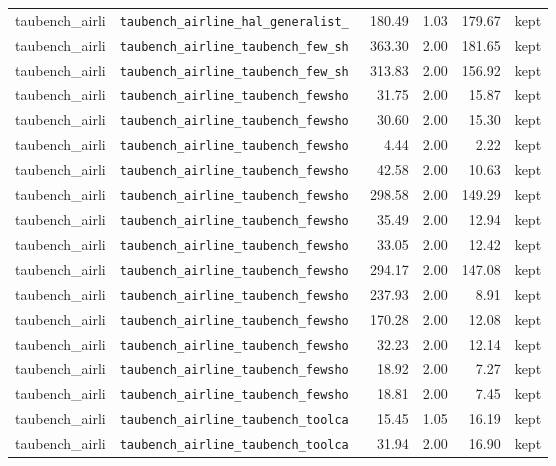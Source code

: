 {\begin{longtable}{llrrrl}
taubench\_airli & \texttt{\scriptsize taubench\_airline\_hal\_generalist\_~} & 180.49 & 1.03 & 179.67 & kept \\
taubench\_airli & \texttt{\scriptsize taubench\_airline\_taubench\_few\_sh~} & 363.30 & 2.00 & 181.65 & kept \\
taubench\_airli & \texttt{\scriptsize taubench\_airline\_taubench\_few\_sh~} & 313.83 & 2.00 & 156.92 & kept \\
taubench\_airli & \texttt{\scriptsize taubench\_airline\_taubench\_fewsho~} & 31.75 & 2.00 & 15.87 & kept \\
taubench\_airli & \texttt{\scriptsize taubench\_airline\_taubench\_fewsho~} & 30.60 & 2.00 & 15.30 & kept \\
taubench\_airli & \texttt{\scriptsize taubench\_airline\_taubench\_fewsho~} & 4.44 & 2.00 & 2.22 & kept \\
taubench\_airli & \texttt{\scriptsize taubench\_airline\_taubench\_fewsho~} & 42.58 & 2.00 & 10.63 & kept \\
taubench\_airli & \texttt{\scriptsize taubench\_airline\_taubench\_fewsho~} & 298.58 & 2.00 & 149.29 & kept \\
taubench\_airli & \texttt{\scriptsize taubench\_airline\_taubench\_fewsho~} & 35.49 & 2.00 & 12.94 & kept \\
taubench\_airli & \texttt{\scriptsize taubench\_airline\_taubench\_fewsho~} & 33.05 & 2.00 & 12.42 & kept \\
taubench\_airli & \texttt{\scriptsize taubench\_airline\_taubench\_fewsho~} & 294.17 & 2.00 & 147.08 & kept \\
taubench\_airli & \texttt{\scriptsize taubench\_airline\_taubench\_fewsho~} & 237.93 & 2.00 & 8.91 & kept \\
taubench\_airli & \texttt{\scriptsize taubench\_airline\_taubench\_fewsho~} & 170.28 & 2.00 & 12.08 & kept \\
taubench\_airli & \texttt{\scriptsize taubench\_airline\_taubench\_fewsho~} & 32.23 & 2.00 & 12.14 & kept \\
taubench\_airli & \texttt{\scriptsize taubench\_airline\_taubench\_fewsho~} & 18.92 & 2.00 & 7.27 & kept \\
taubench\_airli & \texttt{\scriptsize taubench\_airline\_taubench\_fewsho~} & 18.81 & 2.00 & 7.45 & kept \\
taubench\_airli & \texttt{\scriptsize taubench\_airline\_taubench\_toolca~} & 15.45 & 1.05 & 16.19 & kept \\
taubench\_airli & \texttt{\scriptsize taubench\_airline\_taubench\_toolca~} & 31.94 & 2.00 & 16.90 & kept \\

\end{longtable}}
